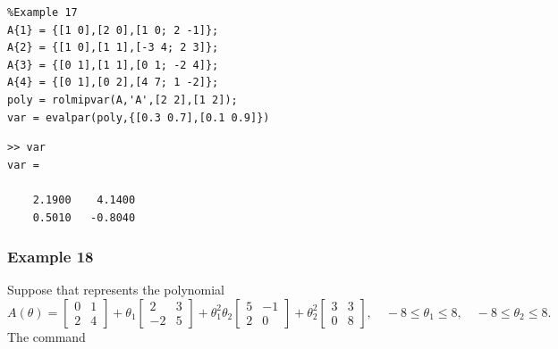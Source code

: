 \documentclass[english,11pt]{article}
\theoremstyle{break} \theorembodyfont{\small\rm}
\begin{document}
\begin{minipage}{10.5cm}
 \begin{lstlisting}
%Example 17
A{1} = {[1 0],[2 0],[1 0; 2 -1]};
A{2} = {[1 0],[1 1],[-3 4; 2 3]};
A{3} = {[0 1],[1 1],[0 1; -2 4]};
A{4} = {[0 1],[0 2],[4 7; 1 -2]};
poly = rolmipvar(A,'A',[2 2],[1 2]);
var = evalpar(poly,{[0.3 0.7],[0.1 0.9]})
 \end{lstlisting}
\end{minipage}
\vspace{0.2cm}

\begin{minipage}{7.5cm}
\begin{lstlisting}[rulecolor=\color{red}]
>> var
var =

    2.1900    4.1400
    0.5010   -0.8040
\end{lstlisting}
\end{minipage}
\vspace{0.2cm}


\subsubsection*{Example 18}

Suppose that  represents the polynomial
\[
 A(\theta) = \begin{bmatrix} 0 & 1 \\ 2 & 4 \end{bmatrix} +
 \theta_1 \begin{bmatrix} 2 & 3 \\ -2 & 5 \end{bmatrix} +
 \theta_1^2\theta_2 \begin{bmatrix} 5 & -1\\ 2 & 0 \end{bmatrix} +
 \theta_2^2 \begin{bmatrix} 3 & 3 \\ 0 & 8 \end{bmatrix}, \quad -8 \leq \theta_1 \leq 8, \quad -8 \leq \theta_2 \leq 8.
\]
The command

\vspace{0.5cm}%
\noindent\begin{minipage}{\linewidth}
\end{minipage}
\vspace{0.2cm}
\end{document}

